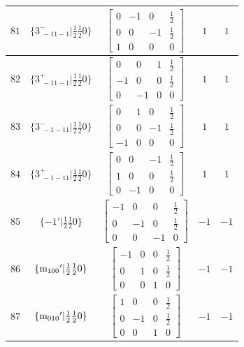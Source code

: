 \documentclass[fleqn,8pt]{jsarticle}
\begin{document}
\begin{longtable}{ccccc}
$ 81 $ & $ \{3^{-}_{\,\,-11-1}|\frac{1}{2} \frac{1}{2} 0\} $ & $ \begin{bmatrix} 0 & -1 & 0 & \frac{1}{2} \\ 0 & 0 & -1 & \frac{1}{2} \\ 1 & 0 & 0 & 0 \end{bmatrix} $ & $ 1 $ & $ 1 $ \\ \hline
$ 82 $ & $ \{3^{+}_{\,\,-11-1}|\frac{1}{2} \frac{1}{2} 0\} $ & $ \begin{bmatrix} 0 & 0 & 1 & \frac{1}{2} \\ -1 & 0 & 0 & \frac{1}{2} \\ 0 & -1 & 0 & 0 \end{bmatrix} $ & $ 1 $ & $ 1 $ \\ \hline
$ 83 $ & $ \{3^{-}_{\,\,-1-11}|\frac{1}{2} \frac{1}{2} 0\} $ & $ \begin{bmatrix} 0 & 1 & 0 & \frac{1}{2} \\ 0 & 0 & -1 & \frac{1}{2} \\ -1 & 0 & 0 & 0 \end{bmatrix} $ & $ 1 $ & $ 1 $ \\ \hline
$ 84 $ & $ \{3^{+}_{\,\,-1-11}|\frac{1}{2} \frac{1}{2} 0\} $ & $ \begin{bmatrix} 0 & 0 & -1 & \frac{1}{2} \\ 1 & 0 & 0 & \frac{1}{2} \\ 0 & -1 & 0 & 0 \end{bmatrix} $ & $ 1 $ & $ 1 $ \\ \hline
$ 85 $ & $ \{-1{}'|\frac{1}{2} \frac{1}{2} 0\} $ & $ \begin{bmatrix} -1 & 0 & 0 & \frac{1}{2} \\ 0 & -1 & 0 & \frac{1}{2} \\ 0 & 0 & -1 & 0 \end{bmatrix} $ & $ -1 $ & $ -1 $ \\ \hline
$ 86 $ & $ \{{\rm m}_{100}{}'|\frac{1}{2} \frac{1}{2} 0\} $ & $ \begin{bmatrix} -1 & 0 & 0 & \frac{1}{2} \\ 0 & 1 & 0 & \frac{1}{2} \\ 0 & 0 & 1 & 0 \end{bmatrix} $ & $ -1 $ & $ -1 $ \\ \hline
$ 87 $ & $ \{{\rm m}_{010}{}'|\frac{1}{2} \frac{1}{2} 0\} $ & $ \begin{bmatrix} 1 & 0 & 0 & \frac{1}{2} \\ 0 & -1 & 0 & \frac{1}{2} \\ 0 & 0 & 1 & 0 \end{bmatrix} $ & $ -1 $ & $ -1 $ \\ \hline

\end{longtable}
\end{document}
